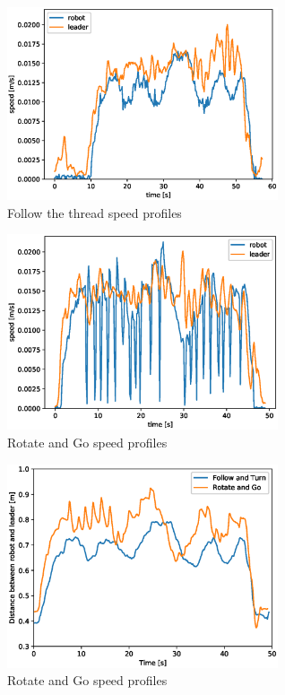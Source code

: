 \documentclass[journal]{IEEEtran}
\begin{document}
\begin{figure}[h!]
\centering
\includegraphics[width=8cm]{images/ft1cap_leader_robot_speed.eps}
\caption{Follow the thread speed profiles}
\label{fig:distance_sim}
\end{figure}


\begin{figure}[h!]
\centering
\includegraphics[width=8cm]{images/rg2cap_leader_robot_speed.eps}
\caption{Rotate and Go speed profiles}
\label{fig:distance_sim}
\end{figure}


\begin{figure}[h!]
\centering
\includegraphics[width=8cm]{images/cap_ft_vs_rg_dist.eps}
\caption{Rotate and Go speed profiles}
\label{fig:distance_sim}
\end{figure}
\end{document}
